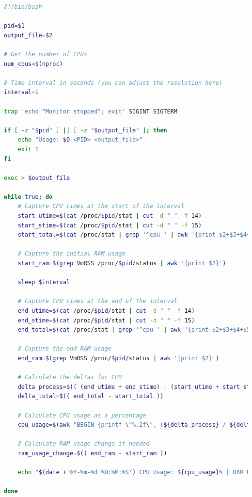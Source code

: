 \begin{lstlisting}[language=bash, caption={Custom Monitor Script for Performance Tracking}, label={lst}] 
#!/bin/bash

pid=$1
output_file=$2

# Get the number of CPUs
num_cpus=$(nproc)

# Time interval in seconds (you can adjust the resolution here)
interval=1

trap 'echo "Monitor stopped"; exit' SIGINT SIGTERM

if [ -z "$pid" ] || [ -z "$output_file" ]; then
    echo "Usage: $0 <PID> <output_file>"
    exit 1
fi

exec > $output_file

while true; do
    # Capture CPU times at the start of the interval
    start_utime=$(cat /proc/$pid/stat | cut -d " " -f 14)
    start_stime=$(cat /proc/$pid/stat | cut -d " " -f 15)
    start_total=$(cat /proc/stat | grep '^cpu ' | awk '{print $2+$3+$4+$5+$6+$7+$8}')

    # Capture the initial RAM usage
    start_ram=$(grep VmRSS /proc/$pid/status | awk '{print $2}')

    sleep $interval

    # Capture CPU times at the end of the interval
    end_utime=$(cat /proc/$pid/stat | cut -d " " -f 14)
    end_stime=$(cat /proc/$pid/stat | cut -d " " -f 15)
    end_total=$(cat /proc/stat | grep '^cpu ' | awk '{print $2+$3+$4+$5+$6+$7+$8}')

    # Capture the end RAM usage
    end_ram=$(grep VmRSS /proc/$pid/status | awk '{print $2}')

    # Calculate the deltas for CPU
    delta_process=$(( (end_utime + end_stime) - (start_utime + start_stime) ))
    delta_total=$(( end_total - start_total ))

    # Calculate CPU usage as a percentage
    cpu_usage=$(awk "BEGIN {printf \"%.2f\", (${delta_process} / ${delta_total}) * 100 * ${num_cpus}}")

    # Calculate RAM usage change if needed
    ram_usage_change=$(( end_ram - start_ram ))

    echo "$(date +'%Y-%m-%d %H:%M:%S') CPU Usage: ${cpu_usage}% | RAM Usage Change: ${ram_usage_change} kB"

done
\end{lstlisting}

